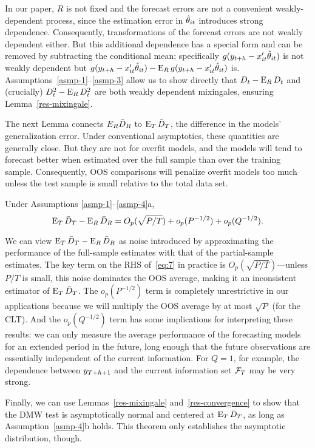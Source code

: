 \documentclass[12pt]{article}
\begin{document}
In our paper, $R$ is not fixed and the forecast errors are not a
convenient weakly-dependent process, since the estimation error in
$\hat\theta_{it}$ introduces strong dependence. Consequently,
transformations of the forecast errors are not weakly dependent
either. But this additional dependence has a special form and can be
removed by subtracting the conditional mean; specifically $g(y_{t+h} -
x_{it}'\hat\theta_{it})$ is not weakly dependent but $g(y_{t+h} -
x_{it}'\hat\theta_{it}) - \operatorname{E}_R g(y_{t+h} - x_{it}'\hat\theta_{it})$ is.
Assumptions~\ref{asmp-1}--\ref{asmp-3} allow us to show directly
that $D_t - \operatorname{E}_R D_t$ and (crucially) $D^2_t - \operatorname{E}_R D_t^2$ are both
weakly dependent mixingales, ensuring Lemma~\ref{res-mixingale}.

The next Lemma connects $E_R \bar{D}_{R}$ to $\operatorname{E}_T \bar{D}_{T}$, the difference in
the models' generalization error. Under conventional asymptotics,
these quantities are generally close. But they are not for overfit
models, and the models will tend to forecast better when estimated over the
full sample than over the training sample. Consequently, OOS
comparisons will penalize overfit models too much unless the test
sample is small relative to the total data set.

\begin{lem} \label{res-convergence}
  Under Assumptions \ref{asmp-1}--\ref{asmp-4}a,
  \begin{equation}\label{eq:7}
    \operatorname{E}_T \bar{D}_{T} - \operatorname{E}_R \bar{D}_{R} = O_p(\sqrt{P/T}) + o_p(P^{-1/2})
    + o_p(Q^{-1/2}).
  \end{equation}
\end{lem}
We can view $\operatorname{E}_T \bar{D}_{T} - \operatorname{E}_R \bar{D}_{R}$ as noise introduced by
approximating the performance of the full-sample estimates with that
of the partial-sample estimates. The key term on the RHS
of~\eqref{eq:7} in practice is $O_p(\sqrt{P/T})$---unless $P/T$ is
small, this noise dominates the OOS average, making it an inconsistent
estimator of $\operatorname{E}_T \bar{D}_{T}$. The $o_p(P^{-1/2})$ term is completely
unrestrictive in our applications because we will multiply the OOS
average by at most $\sqrt{P}$ (for the CLT). And the $o_p(Q^{-1/2})$
term has some implications for interpreting these results: we can only
measure the average performance of the forecasting models for an
extended period in the future, long enough that the future
observations are essentially independent of the current
information. For $Q=1$, for example, the dependence between
$y_{T+h+1}$ and the current information set $\mathcal{F}_T$ may be very
strong.

Finally, we can use Lemmas~\ref{res-mixingale}
and~\ref{res-convergence} to show that the DMW test is asymptotically
normal and centered at $\operatorname{E}_T \bar{D}_{T}$, as long as
Assumption~\ref{asmp-4}b holds. This theorem only establishes the
asymptotic distribution, though.
\end{document}
